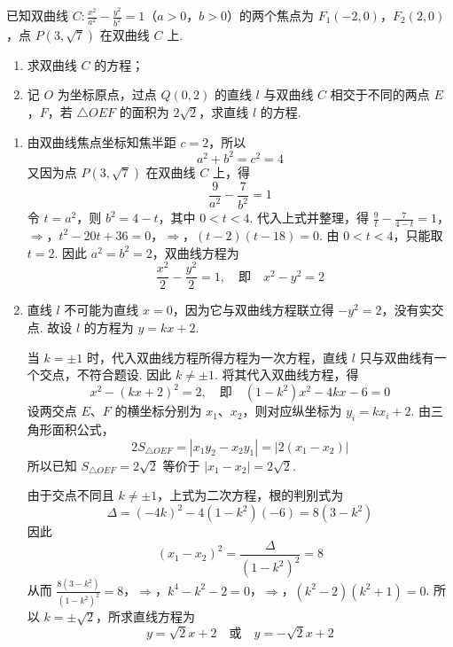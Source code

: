 \begin{problem}
已知双曲线 \(C: \frac{x^2}{a^2} - \frac{y^2}{b^2} = 1\)（\(a > 0\)，\(b > 0\)）的两个焦点为 \(F_1(-2,0)\)，\(F_2(2,0)\)，点 \(P(3, \sqrt{7})\) 在双曲线 \(C\) 上.
\begin{enumerate}
\item 求双曲线 \(C\) 的方程；
\item 记 \(O\) 为坐标原点，过点 \(Q(0,2)\) 的直线 \(l\) 与双曲线 \(C\) 相交于不同的两点 \(E\)，\(F\)，若 \(\triangle OEF\) 的面积为 \(2\sqrt{2}\)，求直线 \(l\) 的方程.
\end{enumerate}
\end{problem}

\begin{solution}
\begin{enumerate}
\item 由双曲线焦点坐标知焦半距 \(c=2\)，所以
\[
a^2+b^2=c^2=4
\]
又因为点 \(P(3,\sqrt{7})\) 在双曲线 \(C\) 上，得
\[
\frac{9}{a^2}-\frac{7}{b^2}=1
\]
令 \(t=a^2\)，则 \(b^2=4-t\)，其中 \(0<t<4\). 代入上式并整理，得
\(\frac{9}{t}-\frac{7}{4-t}=1\)，\(\Longrightarrow\)，\(t^2-20t+36=0\)，\(\Longrightarrow\)，\((t-2)(t-18)=0\).
由 \(0<t<4\)，只能取 \(t=2\). 因此 \(a^2=b^2=2\)，双曲线方程为
\[
\frac{x^2}{2}-\frac{y^2}{2}=1,
\quad\text{即}\quad x^2-y^2=2
\]

\item 直线 \(l\) 不可能为直线 \(x=0\)，因为它与双曲线方程联立得 \(-y^2=2\)，没有实交点. 故设 \(l\) 的方程为 \(y=kx+2\).

当 \(k=\pm1\) 时，代入双曲线方程所得方程为一次方程，直线 \(l\) 只与双曲线有一个交点，不符合题设. 因此 \(k\ne\pm1\). 将其代入双曲线方程，得
\[
x^2-(kx+2)^2=2,
\quad\text{即}\quad
(1-k^2)x^2-4kx-6=0
\]
设两交点 \(E\)、\(F\) 的横坐标分别为 \(x_1\)、\(x_2\)，则对应纵坐标为 \(y_i=kx_i+2\). 由三角形面积公式，
\[
2S_{\triangle OEF}=|x_1y_2-x_2y_1|=|2(x_1-x_2)|
\]
所以已知 \(S_{\triangle OEF}=2\sqrt{2}\) 等价于 \(|x_1-x_2|=2\sqrt{2}\).

由于交点不同且 \(k\ne\pm1\)，上式为二次方程，根的判别式为
\[
\Delta=(-4k)^2-4(1-k^2)(-6)=8(3-k^2)
\]
因此
\[
(x_1-x_2)^2=\frac{\Delta}{(1-k^2)^2}=8
\]
从而
\(\frac{8(3-k^2)}{(1-k^2)^2}=8\)，\(\Longrightarrow\)，\(k^4-k^2-2=0\)，\(\Longrightarrow\)，\((k^2-2)(k^2+1)=0\).
所以 \(k=\pm\sqrt{2}\)，所求直线方程为
\[
y=\sqrt{2}x+2\quad\text{或}\quad y=-\sqrt{2}x+2
\]
\end{enumerate}
\end{solution}

